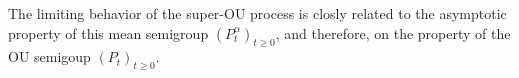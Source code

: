 \documentclass[12pt,a4paper]{amsart}
\theoremstyle{plain}
\theoremstyle{definition}
\numberwithin{equation}{section}
\begin{document}
    The limiting behavior of the super-OU process is closly related to the asymptotic property of this mean semigroup $(P^\alpha_t)_{t\geq 0}$, and therefore, on the property of the OU semigoup $(P_t)_{t\geq 0}$. 
    
\end{document}

